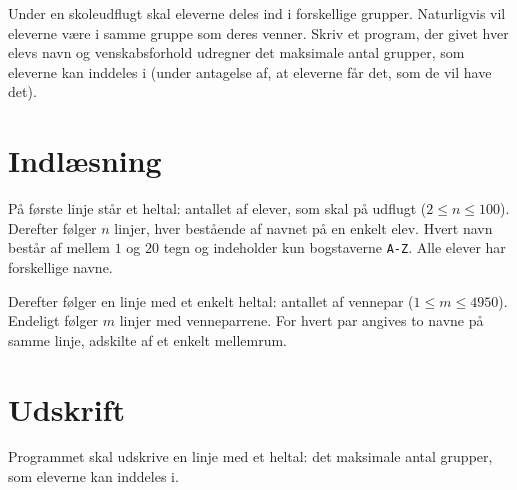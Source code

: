 
Under en skoleudflugt skal eleverne deles ind i forskellige grupper.
Naturligvis vil eleverne være i samme gruppe som deres venner.
Skriv et program, der givet hver elevs navn og venskabsforhold udregner det maksimale antal grupper, som eleverne kan inddeles i (under antagelse af, at eleverne får det, som de vil have det).

\section*{Indlæsning}

På første linje står et heltal: antallet af elever, som skal på udflugt ($2 \le n \le 100$).
Derefter følger $n$ linjer, hver bestående af navnet på en enkelt elev.
Hvert navn består af mellem $1$ og $20$ tegn og indeholder kun bogstaverne \texttt{A-Z}.
Alle elever har forskellige navne.

Derefter følger en linje med et enkelt heltal: antallet af vennepar ($1 \le m \le 4950$).
Endeligt følger $m$ linjer med venneparrene.
For hvert par angives to navne på samme linje, adskilte af et enkelt mellemrum.

\section*{Udskrift}
Programmet skal udskrive en linje med et heltal: det maksimale antal grupper, som eleverne kan inddeles i.
